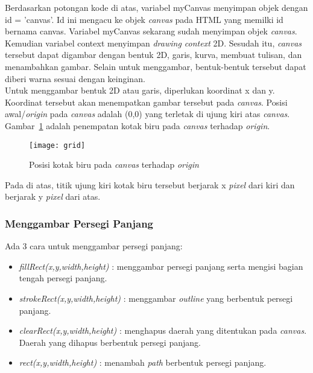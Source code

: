 Berdasarkan potongan kode di atas, variabel myCanvas menyimpan objek dengan id = 'canvas'. Id ini mengacu ke objek \textit{canvas} pada HTML yang memilki id bernama canvas. Variabel myCanvas sekarang sudah menyimpan objek \textit{canvas}. Kemudian variabel context menyimpan \textit{drawing context} 2D. Sesudah itu, \textit{canvas} tersebut dapat digambar dengan bentuk 2D, garis, kurva, membuat tulisan, dan menambahkan gambar. Selain untuk menggambar, bentuk-bentuk tersebut dapat diberi warna sesuai dengan keinginan.\\

Untuk menggambar bentuk 2D atau garis, diperlukan koordinat x dan y. Koordinat tersebut akan menempatkan gambar tersebut pada \textit{canvas}. Posisi awal/\textit{origin} pada \textit{canvas} adalah (0,0) yang terletak di ujung kiri atas \textit{canvas}. Gambar~\ref{fig:grid} adalah penempatan kotak biru pada \textit{canvas} terhadap \textit{origin}.

\begin{figure}[H]
	\centering  
	\texttt{[image: grid]}
	\caption[Posisi kotak biru pada \textit{canvas} terhadap \textit{origin}]{Posisi kotak biru pada \textit{canvas} terhadap \textit{origin}\cite{MDN:05:Web}}
	\label{fig:grid} 
\end{figure} 

Pada di atas, titik ujung kiri kotak biru tersebut berjarak x \textit{pixel} dari kiri dan berjarak y \textit{pixel} dari atas. 

\subsubsection{Menggambar Persegi Panjang}
Ada 3 cara untuk menggambar persegi panjang:

\begin{itemize}
	\item \textit{fillRect(x,y,width,height)} : menggambar persegi panjang serta mengisi bagian tengah persegi panjang.
	\item \textit{strokeRect(x,y,width,height)} : menggambar \textit{outline} yang berbentuk persegi panjang.
	\item \textit{clearRect(x,y,width,height)} : menghapus daerah yang ditentukan pada \textit{canvas}. Daerah yang dihapus berbentuk persegi panjang.
	\item \textit{rect(x,y,width,height)} : menambah \textit{path} berbentuk persegi panjang.
\end{itemize}


